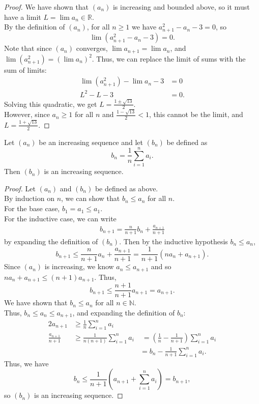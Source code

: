 \documentclass{article}
\newenvironment{theorem}[1]{\renewcommand\theinnercustomthm{#1}\innercustomthm}
  {\endinnercustomthm}
\begin{document}
\begin{proof}
    We have shown that $(a_n)$ is increasing and bounded above, so it must have a limit $L = \lim a_n \in \mathbb R$. \\
    By the definition of $(a_n)$, for all $n \ge 1$ we have $a_{n+1}^2 - a_n-3 = 0$, so 
    \[
    \lim \left(a_{n+1}^2 - a_n - 3\right) = 0.\]
    Note that since $(a_n)$ converges, $\lim a_{n+1} = \lim a_n$, and $\lim (a_{n+1}^2) = (\lim a_n)^2$. Thus, we can replace the limit of sums with the sum of limits:
    \begin{align*}
    \lim (a_{n+1}^2) - \lim a_n - 3&=0 \\
    L^2 - L - 3&= 0.
    \end{align*}
    Solving this quadratic, we get $L = \frac{1\pm \sqrt{13}}{2}$. \\ However, since $a_n \ge 1$ for all $n$ and $\frac{1-\sqrt{13}}{2}< 1$, this cannot be the limit, and $L = \frac{1+\sqrt{13}}{2}$.
\end{proof}

\begin{theorem}{3}
    Let $(a_n)$ be an increasing sequence and let $(b_n)$ be defined as
    \[ b_n = \frac{1}{n}\sum_{i=1}^n a_i.\]
    Then $(b_n)$ is an increasing sequence.
\end{theorem}
\begin{proof}
    Let $(a_n)$ and $(b_n)$ be defined as above. \\
    By induction on $n$, we can show that $b_n \le a_n$ for all $n$. \\
    For the base case, $b_1 = a_1 \le a_1$. \\
    For the inductive case, we can write
    \begin{align*}
        b_{n+1} = \frac{n}{n+1} b_{n} + \frac{a_{n+1}}{n+1}
    \end{align*}
    by expanding the definition of $(b_n)$. Then by the inductive hypothesis $b_n \le a_n$,
    \[
    b_{n+1} \le \frac{n}{n+1} a_n + \frac{a_{n+1}}{n+1} = \frac{1}{n+1} \left(n a_n + a_{n+1}\right).
    \]
    Since $(a_n)$ is increasing, we know $a_n \le a_{n+1}$ and so $na_n + a_{n+1} \le (n+1) a_{n+1}$. Thus,
    \[
    b_{n+1} \le \frac{n+1}{n+1} a_{n+1} = a_{n+1}.
    \]
    We have shown that $b_n \le a_n$ for all $n \in \mathbb N$. \\
    Thus, $b_n \le a_n \le a_{n+1}$, and expanding the definition of $b_n$:
    \begin{alignat*}{2}
        a_{n+1} &\ge \frac{1}{n}\sum_{i=1}^n a_i \\
        \frac{a_{n+1}}{n+1} &\ge \frac{1}{n(n+1)} \sum_{i=1}^n a_i &\;= \left(\frac{1}{n} -\frac{1}{n+1}\right) \sum_{i=1}^n a_i \\&\qquad   &= b_n - \frac{1}{n+1} \sum_{i=1}^n a_i.
    \end{alignat*}
    Thus, we have \[b_n \le \frac{1}{n+1} \left(a_{n+1} + \sum_{i=1}^n a_i\right) = b_{n+1},\]
    so $(b_n)$ is an increasing sequence.
\end{proof}
\end{document}
